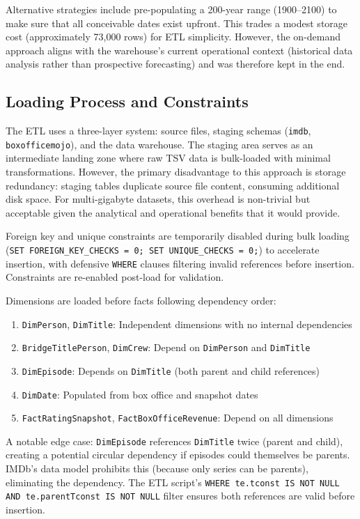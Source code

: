 Alternative strategies include pre-populating a 200-year range (1900–2100) to make sure that all conceivable dates exist upfront. This trades a modest storage cost (approximately 73,000 rows) for ETL simplicity. However, the on-demand approach aligns with the warehouse's current operational context (historical data analysis rather than prospective forecasting) and was therefore kept in the end.

\subsection{Loading Process and Constraints}

The ETL uses a three-layer system: source files, staging schemas (\texttt{imdb}, \texttt{boxofficemojo}), and the data warehouse. The staging area serves as an intermediate landing zone where raw TSV data is bulk-loaded with minimal transformations. However, the primary disadvantage to this approach is storage redundancy: staging tables duplicate source file content, consuming additional disk space. For multi-gigabyte datasets, this overhead is non-trivial but acceptable given the analytical and operational benefits that it would provide.

Foreign key and unique constraints are temporarily disabled during bulk loading (\texttt{SET FOREIGN\_KEY\_CHECKS = 0; SET UNIQUE\_CHECKS = 0;}) to accelerate insertion, with defensive \texttt{WHERE} clauses filtering invalid references before insertion. Constraints are re-enabled post-load for validation.

Dimensions are loaded before facts following dependency order: 

\begin{enumerate}
    \item \texttt{DimPerson}, \texttt{DimTitle}: Independent dimensions with no internal dependencies
    \item \texttt{BridgeTitlePerson}, \texttt{DimCrew}: Depend on \texttt{DimPerson} and \texttt{DimTitle}
    \item \texttt{DimEpisode}: Depends on \texttt{DimTitle} (both parent and child references)
    \item \texttt{DimDate}: Populated from box office and snapshot dates
    \item \texttt{FactRatingSnapshot}, \texttt{FactBoxOfficeRevenue}: Depend on all dimensions
\end{enumerate}

A notable edge case: \texttt{DimEpisode} references \texttt{DimTitle} twice (parent and child), creating a potential circular dependency if episodes could themselves be parents. IMDb's data model prohibits this (because only series can be parents), eliminating the dependency. The ETL script's \texttt{WHERE te.tconst IS NOT NULL AND te.parentTconst IS NOT NULL} filter ensures both references are valid before insertion.

